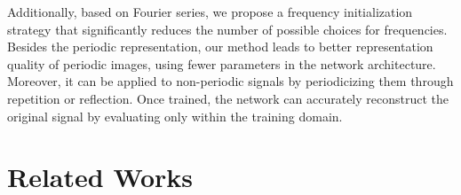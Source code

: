 Additionally, based on Fourier series, we propose a frequency initialization strategy that significantly reduces the number of possible choices for frequencies. Besides the periodic representation, our method leads to better representation quality of periodic images, using fewer parameters in the network architecture. Moreover, it can be applied to non-periodic signals by periodicizing them through repetition or reflection. Once trained, the network can accurately reconstruct the original signal by evaluating only within the training domain.









\section{Related Works}


